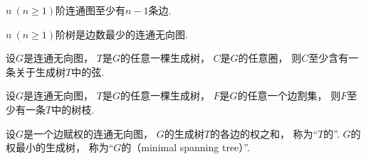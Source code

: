 \begin{corollary}
\(n\ (n\geq1)\)阶连通图至少有\(n-1\)条边.
\end{corollary}

\begin{corollary}
\(n\ (n\geq1)\)阶树是边数最少的连通无向图.
\end{corollary}

\begin{example}
设\(G\)是连通无向图，
\(T\)是\(G\)的任意一棵生成树，
\(C\)是\(G\)的任意圈，
则\(C\)至少含有一条关于生成树\(T\)中的弦.
\end{example}

\begin{example}
设\(G\)是连通无向图，
\(T\)是\(G\)的任意一棵生成树，
\(F\)是\(G\)的任意一个边割集，
则\(F\)至少有一条\(T\)中的树枝.
\end{example}

\begin{definition}
设\(G\)是一个边赋权的连通无向图，
\(G\)的生成树\(T\)的各边的权之和，
称为“\(T\)的”.
\(G\)的权最小的生成树，
称为“\(G\)的（minimal spanning tree）”.
\end{definition}
